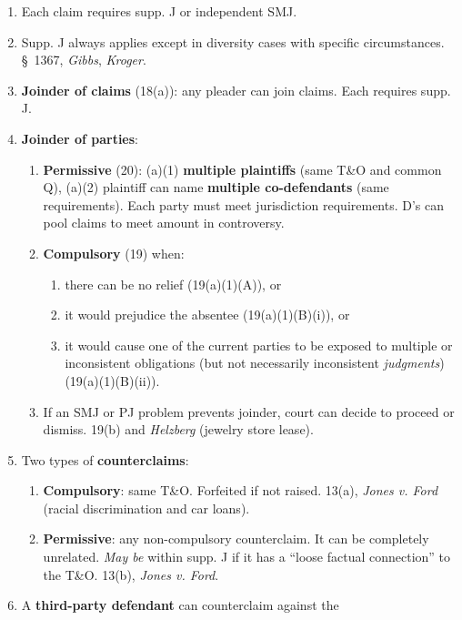 \begin{enumerate}
    \item Each claim requires supp. J or independent SMJ.
    \item Supp. J always applies except in diversity cases with specific 
    circumstances. \S\ 1367, \emph{Gibbs}, \emph{Kroger}.
    \item \textbf{Joinder of claims} (18(a)): any pleader can join claims. 
    Each requires supp. J. 
    \item \textbf{Joinder of parties}:
    \begin{enumerate}
        \item \textbf{Permissive} (20): (a)(1) \textbf{multiple 
        plaintiffs} (same T\&O and common Q), (a)(2) plaintiff can name 
        \textbf{multiple co-defendants} (same requirements). Each party must 
        meet jurisdiction requirements. D's can pool claims to meet amount in 
        controversy.
        \item \textbf{Compulsory} (19) when:
        \begin{enumerate}
            \item there can be no relief (19(a)(1)(A)), or
            \item it would prejudice the absentee (19(a)(1)(B)(i)), or
            \item it would cause one of the current parties to be exposed to 
            multiple or inconsistent obligations (but not necessarily 
            inconsistent \emph{judgments}) (19(a)(1)(B)(ii)).
        \end{enumerate}
        \item If an SMJ or PJ problem prevents joinder, court can decide to 
        proceed or dismiss. 19(b) and \emph{Helzberg} (jewelry store lease).
    \end{enumerate}
    \item Two types of \textbf{counterclaims}:
    \begin{enumerate}
        \item \textbf{Compulsory}: same T\&O. Forfeited if not raised. 13(a), 
        \emph{Jones v. Ford} (racial discrimination and car loans).
        \item \textbf{Permissive}: any non-compulsory counterclaim. It can be 
        completely unrelated. \emph{May be} within supp. J if it has a ``loose 
        factual connection'' to the T\&O. 13(b), \emph{Jones v. Ford}.
    \end{enumerate}
    \item A \textbf{third-party defendant} can counterclaim against the 

\end{enumerate}
